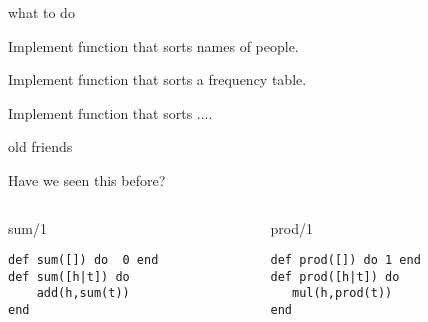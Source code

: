 \begin{frame}{what to do}

\vspace{10pt}\pause Implement function that sorts names of people.

\vspace{10pt}\pause Implement function that sorts a frequency table.

\vspace{10pt}\pause Implement function that sorts ....

\end{frame}

\begin{frame}[fragile]{old friends}

Have we seen this before?

\pause\vspace{20pt}
\begin{columns}
   \begin{column}{.5\linewidth}
     \begin{block}{sum/1}
       \begin{verbatim}
def sum([]) do  0 end
def sum([h|t]) do
    add(h,sum(t))
end
       \end{verbatim}
       \vfill
     \end{block}
   \end{column} 
\pause
   \begin{column}{.5\linewidth}
     \begin{block}{prod/1}
       \begin{verbatim}
def prod([]) do 1 end
def prod([h|t]) do
   mul(h,prod(t))
end
       \end{verbatim}
       \vfill
     \end{block}
   \end{column}
  \end{columns}

\vspace{20pt}{\em There is no built-in add/2, nor mul/2, but we can pretend that there is.}

\end{frame}


